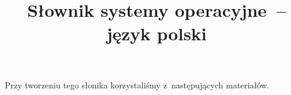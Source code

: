 \documentclass[a4paper,11pt]{article}
\title{Słownik systemy operacyjne~-- język polski}
\begin{document}





\maketitle





Przy tworzeniu tego słonika korzystaliśmy z~następujących materiałów. %

\vspace{1.5em}
\end{document}
